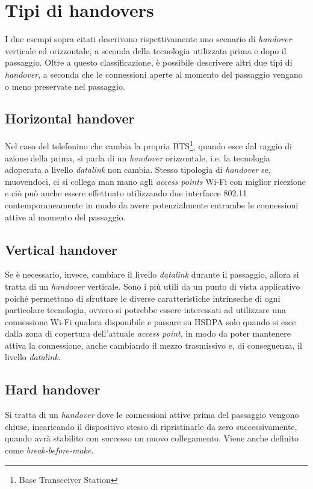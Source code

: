 \section{Tipi di handovers}
I due esempi sopra citati descrivono rispettivamente uno scenario di {\em handover} verticale ed orizzontale, a seconda della tecnologia utilizzata prima e dopo il passaggio. Oltre a questo classificazione, è possibile descrivere altri due tipi di {\em handover}, a seconda che le connessioni aperte al momento del passaggio vengano o meno preservate nel passaggio.

\subsection{Horizontal handover}
Nel caso del telefonino che cambia la propria BTS\footnote{Base Transceiver Station}, quando esce dal raggio di azione della prima, si parla di un {\em handover} orizzontale, i.e. la tecnologia adoperata a livello {\em datalink} non cambia. Stesso tipologia di {\em handover} se, muovendoci, ci si collega man mano agli {\em access points} Wi-Fi con miglior ricezione e ciò può anche essere effettuato utilizzando due interfacce 802.11 contemporaneamente in modo da avere potenzialmente entrambe le connessioni attive al momento del passaggio.

\subsection{Vertical handover}
Se è necessario, invece, cambiare il livello {\em datalink} durante il passaggio, allora si tratta di un {\em handover} verticale. Sono i più utili da un punto di vista applicativo poiché permettono di sfruttare le diverse caratteristiche intrinseche di ogni particolare tecnologia, ovvero si potrebbe essere interessati ad utilizzare una connessione Wi-Fi qualora disponibile e passare su HSDPA solo quando si esce dalla zona di copertura dell'attuale {\em access point}, in modo da poter mantenere attiva la connessione, anche cambiando il mezzo trasmissivo e, di conseguenza, il livello {\em datalink}.

\subsection{Hard handover}
Si tratta di un {\em handover} dove le connessioni attive prima del passaggio vengono chiuse, incaricando il dispositivo stesso di ripristinarle da zero successivamente, quando avrà stabilito con successo un nuovo collegamento. Viene anche definito come {\em break-before-make}.

